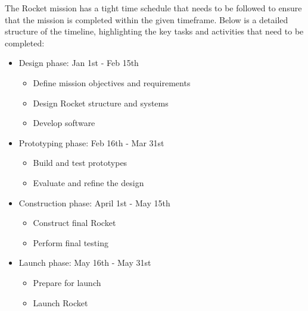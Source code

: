 The Rocket mission has a tight time schedule that needs to be followed to ensure that the mission is completed within the given timeframe. Below is a detailed structure of the timeline, highlighting the key tasks and activities that need to be completed:

\begin{itemize}
    \item Design phase: Jan 1st - Feb 15th
        \begin{itemize}
            \item Define mission objectives and requirements
            \item Design Rocket structure and systems
            \item Develop software
        \end{itemize}
    \item Prototyping phase: Feb 16th - Mar 31st
        \begin{itemize}
            \item Build and test prototypes
            \item Evaluate and refine the design
        \end{itemize}
    \item Construction phase: April 1st - May 15th
        \begin{itemize}
            \item Construct final Rocket
            \item Perform final testing
        \end{itemize}
    \item Launch phase: May 16th - May 31st
        \begin{itemize}
            \item Prepare for launch
            \item Launch Rocket
        \end{itemize}
\end{itemize}

